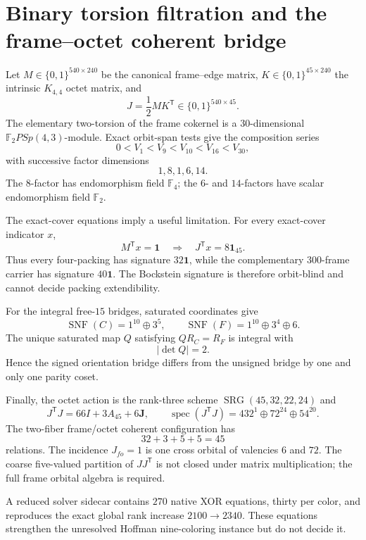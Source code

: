 \section{Binary torsion filtration and the frame--octet coherent bridge}
\label{sec:bt1611-1615}

Let $M\in\{0,1\}^{540\times240}$ be the canonical frame--edge matrix,
$K\in\{0,1\}^{45\times240}$ the intrinsic $K_{4,4}$ octet matrix, and
\[
J=\frac12MK^{\mathsf T}\in\{0,1\}^{540\times45}.
\]
The elementary two-torsion of the frame cokernel is a $30$-dimensional
$\mathbb F_2PSp(4,3)$-module.  Exact orbit-span tests give the composition
series
\[
0<V_1<V_9<V_{10}<V_{16}<V_{30},
\]
with successive factor dimensions
\[
\boxed{1,8,1,6,14}.
\]
The $8$-factor has endomorphism field $\mathbb F_4$; the $6$- and $14$-factors
have scalar endomorphism field $\mathbb F_2$.

The exact-cover equations imply a useful limitation.  For every exact-cover
indicator $x$,
\[
M^{\mathsf T}x=\mathbf1
\quad\Longrightarrow\quad
J^{\mathsf T}x=8\mathbf1_{45}.
\]
Thus every four-packing has signature $32\mathbf1$, while the complementary
$300$-frame carrier has signature $40\mathbf1$.  The Bockstein signature is
therefore orbit-blind and cannot decide packing extendibility.

For the integral free-$15$ bridges, saturated coordinates give
\[
\operatorname{SNF}(C)=1^{10}\oplus3^5,
\qquad
\operatorname{SNF}(F)=1^{10}\oplus3^4\oplus6.
\]
The unique saturated map $Q$ satisfying $QR_C=R_F$ is integral with
\[
\boxed{|\det Q|=2}.
\]
Hence the signed orientation bridge differs from the unsigned bridge by one
and only one parity coset.

Finally, the octet action is the rank-three scheme
$\operatorname{SRG}(45,32,22,24)$ and
\[
J^{\mathsf T}J=66I+3A_{45}+6\mathbf J,
\qquad
\operatorname{spec}(J^{\mathsf T}J)=432^1\oplus72^{24}\oplus54^{20}.
\]
The two-fiber frame/octet coherent configuration has
\[
\boxed{32+3+5+5=45}
\]
relations.  The incidence $J_{fo}=1$ is one cross orbital of valencies $6$ and
$72$.  The coarse five-valued partition of $JJ^{\mathsf T}$ is not closed under
matrix multiplication; the full frame orbital algebra is required.

A reduced solver sidecar contains $270$ native XOR equations, thirty per color,
and reproduces the exact global rank increase $2100\to2340$.  These equations
strengthen the unresolved Hoffman nine-coloring instance but do not decide it.
